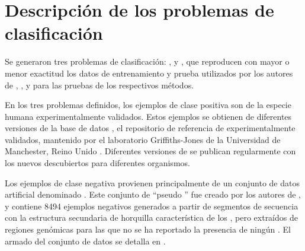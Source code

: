 %
%
%
\section{Descripción de los problemas de clasificación}
%
Se generaron tres {problemas} de clasificación: \prob\tripletsvm{},
\prob{\mipred} y \prob\micropred{}, que reproducen con mayor o menor
exactitud los datos de entrenamiento y prueba utilizados por los
autores de \work{\tripletsvm} \cite{xue}, \work{\mipred} \cite{ng}, y
\work{\micropred} \cite{batuwita} para las pruebas de los respectivos
métodos.

En los tres problemas definidos, los ejemplos de clase positiva
son  de la especie humana experimentalmente validados.
Estos ejemplos se obtienen de diferentes versiones de la base de datos
\work{\mirbase}, el repositorio de referencia de 
experimentalmente validados, mantenido por el laboratorio
Griffiths-Jones de la Universidad de Manchester, Reino Unido
\cite{mirbase1, mirbase2, mirbase3}.
Diferentes versiones de \work\mirbase{} se publican regularmente con
los nuevos  descubiertos para diferentes organismos.

Los ejemplos de clase negativa provienen principalmente de un conjunto
de datos artificial denominado .
Este conjunto de ``pseudo '' fue creado por los autores de
\work{\tripletsvm}, y contiene 8494 ejemplos negativos generados a
partir de segmentos de secuencia con la estructura secundaria de
horquilla característica de los , pero extraídos de
regiones genómicas para las que no se ha reportado la presencia de
ningún \premirna{}.
El armado del conjunto de datos  se detalla en
\cite{xue}.
